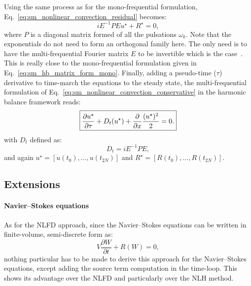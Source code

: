 Using the same process as for the mono-frequential formulation,
Eq.~\eqref{eq:sm_nonlinear_convection_residual} becomes:
\begin{equation}
	i E^{-1} P E u^\star + R^\star = 0,
\end{equation}
where $P$ is a diagonal matrix formed of all the pulsations $\omega_k$.
Note that the exponentials do not need to form an
orthogonal family here. The only need is to have the multi-frequential
Fourier matrix $E$ to be invertible which is the case~\cite{Ekici2007}.
This is really close to the mono-frequential formulation given
in Eq.~\eqref{eq:sm_hb_matrix_form_mono}.
Finally, adding a pseudo-time ($\tau$) derivative 
to time-march the equations to the steady state,
the multi-frequential formulation of 
Eq.~\eqref{eq:sm_nonlinear_convection_conservative} in the harmonic
balance framework reads:
\begin{equation}
	\fbox{$
	\displaystyle \frac{\partial u^\star}{\partial \tau} +
	D_t (u^\star) + 
	\displaystyle \frac{\partial}{\partial x}
		\frac{(u^\star)^2}{2} = 0.
	$}
\end{equation}
with $D_t$ defined as:
\begin{equation}
	D_t = i E^{-1} P E,
	\label{eq:sm_multi_spectral_operator}
\end{equation}
and again $u^\star = [u(t_0), \ldots, u(t_{2N})]$ 
and $R^\star = [R(t_0), \ldots, R(t_{2N})]$.

\subsection{Extensions}

\paragraph{Navier--Stokes equations}
As for the NLFD approach, since the 
Navier--Stokes equations can be written in finite-volume,
semi-discrete form as:
\begin{equation}
	V \frac{\partial W}{\partial t} + R(W) = 0,
\end{equation}
nothing particular has to be made to derive this approach for
the Navier--Stokes equations, except adding the source term computation
in the time-loop.
This shows its advantage over the NLFD and particularly over the NLH method.

